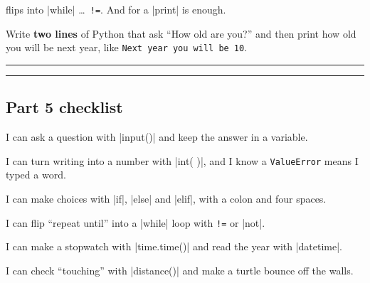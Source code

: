 \begin{think}
 flips into \py|while| \ldots\ \texttt{!=}. And for  a \py|print| is enough.
\end{think}

\begin{puzzle}
Write \textbf{two lines} of Python that ask ``How old are you?'' and then print how old you will be next year, like \texttt{Next year you will be 10}.

\vspace{4pt}
\rule{\linewidth}{0.4pt}\par\vspace{12pt}
\rule{\linewidth}{0.4pt}
\end{puzzle}

\subsection*{Part 5 checklist}
\begingroup\setlength{\parskip}{5pt}
\tick I can ask a question with \py|input()| and keep the answer in a variable.\par
\tick I can turn writing into a number with \py|int( )|, and I know a \texttt{ValueError} means I typed a word.\par
\tick I can make choices with \py|if|, \py|else| and \py|elif|, with a colon and four spaces.\par
\tick I can flip ``repeat until'' into a \py|while| loop with \texttt{!=} or \py|not|.\par
\tick I can make a stopwatch with \py|time.time()| and read the year with \py|datetime|.\par
\tick I can check ``touching'' with \py|distance()| and make a turtle bounce off the walls.\par
\endgroup
